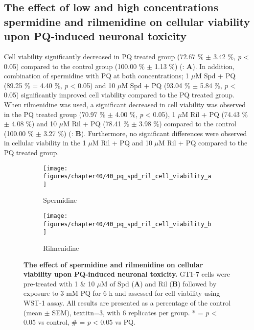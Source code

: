 \subsection{The effect of low and high concentrations spermidine and rilmenidine on cellular viability upon PQ-induced neuronal toxicity} 
Cell viability significantly decreased in PQ treated group (72.67 \% $\pm$ 3.42 \%, \textit{p} < 0.05) compared to the control group (100.00 \% $\pm$ 1.13 \%) (: \textbf{A}). In addition, combination of spermidine with PQ at both concentrations; 1 $\mu$M Spd + PQ (89.25 \% ± 4.40 \%, \textit{p} < 0.05) and 10 $\mu$M Spd + PQ (93.04 \% $\pm$ 5.84 \%, \textit{p} < 0.05) significantly improved cell viability compared to the PQ treated group. When rilmenidine was used, a significant decreased in cell viability was observed in the PQ treated group (70.97 \% $\pm$ 4.00 \%, \textit{p} < 0.05), 1 $\mu$M Ril + PQ (74.43 \% $\pm$ 4.08 \%) and 10 $\mu$M Ril + PQ (78.41 \% $\pm$ 3.98 \%) compared to the control (100.00 \% $\pm$ 3.27 \%) (: \textbf{B}). Furthermore, no significant differences were observed in cellular viability in the 1 $\mu$M Ril + PQ and 10 $\mu$M Ril + PQ compared to the PQ treated group.

\begin{figure}[!htbp]
  \center
  \begin{subfigure}[b]{0.495\linewidth}
    \texttt{[image: figures/chapter40/40\_pq\_spd\_ril\_cell\_viability\_a]}
    \caption{Spermidine}
  \end{subfigure}
  \begin{subfigure}[b]{0.495\linewidth}
    \texttt{[image: figures/chapter40/40\_pq\_spd\_ril\_cell\_viability\_b]}
    \caption{Rilmenidine}
  \end{subfigure}
  \caption[The effect of spermidine and rilmenidine on cellular viability upon PQ-induced neuronal toxicity]{\textbf{The effect of spermidine and rilmenidine on cellular viability upon PQ-induced neuronal toxicity.} GT1-7 cells were pre-treated with 1 \& 10 $\mu$M of Spd (\textbf{A}) and Ril (\textbf{B}) followed by exposure to 3 mM PQ for 6 h and assessed for cell viability using WST-1 assay. All results are presented as a percentage of the control (mean $\pm$ SEM), textit{n}=3, with 6 replicates per group. * = \textit{p} < 0.05 vs control, \# = \textit{p} < 0.05 vs PQ.}
  \label{fig:40_pq_spd_ril_cell_viability_a}
\end{figure}


